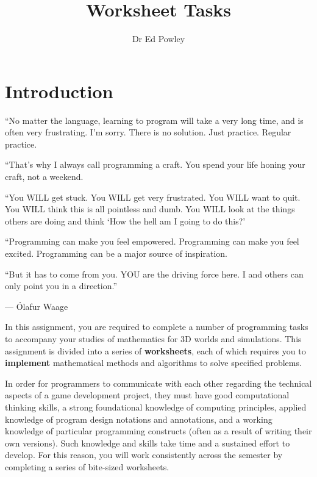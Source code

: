 \documentclass{../../fal_assignment}
\title{Worksheet Tasks}
\author{Dr Ed Powley}
\begin{document}
\maketitle

\section*{Introduction}

\begin{marginquote}
``No matter the language, learning to program will take a very long time, and is often very frustrating. I'm sorry. There is no solution. Just practice. Regular practice.

``That's why I always call programming a craft. You spend your life honing your craft, not a weekend.

``You WILL get stuck.
You WILL get very frustrated.
You WILL want to quit.
You WILL think this is all pointless and dumb.
You WILL look at the things others are doing and think `How the hell am I going to do this?'

``Programming can make you feel empowered.
Programming can make you feel excited.
Programming can be a major source of inspiration.

``But it has to come from you. YOU are the driving force here. I and others can only point you in a direction.''

\par --- \'Olafur Waage
\end{marginquote}

In this assignment, you are required to complete a number of programming tasks to accompany your studies of mathematics for 3D worlds and simulations. This assignment is divided into a series of \textbf{worksheets}, each of which requires you to \textbf{implement} mathematical methods and algorithms to solve specified problems.

In order for programmers to communicate with each other regarding the technical aspects of a game development project, they must have good computational thinking skills, a strong foundational knowledge of computing principles, applied knowledge of program design notations and annotations, and a working knowledge of particular programming constructs (often as a result of writing their own versions). Such knowledge and skills take time and a sustained effort to develop. For this reason, you will work consistently across the semester by completing a series of bite-sized worksheets.
\end{document}
